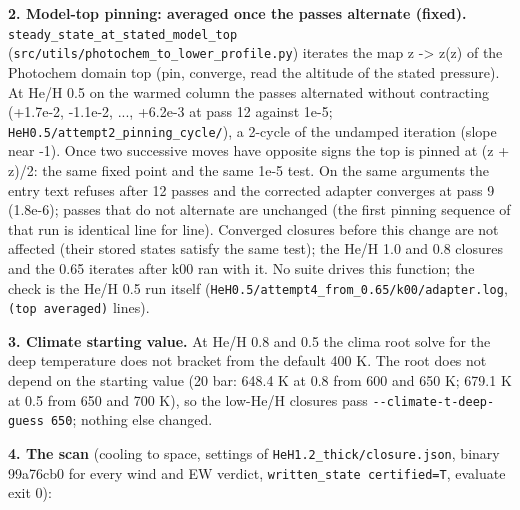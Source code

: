\documentclass[english,a4paper]{my_memo}
\begin{document}
\textbf{2. Model-top pinning: averaged once the passes alternate (fixed).}
\texttt{steady\_state\_at\_stated\_model\_top} (\texttt{src/utils/photochem\_to\_lower\_profile.py})
iterates the map z -\textgreater{} z\textquotesingle(z) of the Photochem domain top (pin, converge,
read the altitude of the stated pressure). At He/H 0.5 on the warmed column
the passes alternated without contracting (+1.7e-2, -1.1e-2, ..., +6.2e-3
at pass 12 against 1e-5; \texttt{HeH0.5/attempt2\_pinning\_cycle/}), a 2-cycle of the
undamped iteration (slope near -1). Once two successive moves have opposite
signs the top is pinned at (z + z\textquotesingle)/2: the same fixed point and the same
1e-5 test. On the same arguments the entry text refuses after 12 passes and
the corrected adapter converges at pass 9 (1.8e-6); passes that do not
alternate are unchanged (the first pinning sequence of that run is
identical line for line). Converged closures before this change are not
affected (their stored states satisfy the same test); the He/H 1.0 and 0.8
closures and the 0.65 iterates after k00 ran with it. No suite drives this
function; the check is the He/H 0.5 run itself
(\texttt{HeH0.5/attempt4\_from\_0.65/k00/adapter.log}, \texttt{(top\ averaged)} lines).

\textbf{3. Climate starting value.} At He/H 0.8 and 0.5 the clima root solve for
the deep temperature does not bracket from the default 400 K. The root
does not depend on the starting value (20 bar: 648.4 K at 0.8 from 600 and
650 K; 679.1 K at 0.5 from 650 and 700 K), so the low-He/H closures pass
\texttt{-\/-climate-t-deep-guess\ 650}; nothing else changed.

\textbf{4. The scan} (cooling to space, settings of \texttt{HeH1.2\_thick/closure.json},
binary 99a76cb0 for every wind and EW verdict, \texttt{written\_state\ certified=T}, evaluate exit 0):
\end{document}
